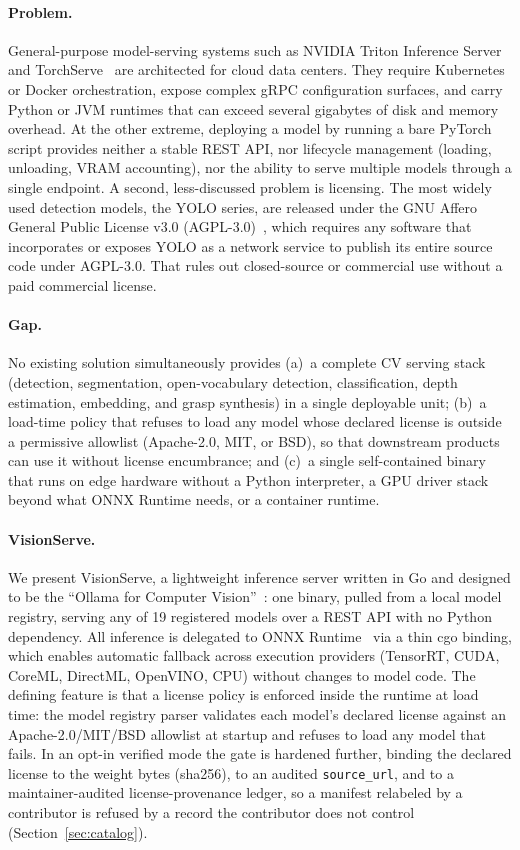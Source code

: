 \paragraph{Problem.}
General-purpose model-serving systems such as NVIDIA Triton Inference Server~\cite{nvidia2023triton}
and TorchServe~\cite{pytorch2023torchserve} are architected for cloud data centers. They
require Kubernetes or Docker orchestration, expose complex gRPC configuration surfaces, and
carry Python or JVM runtimes that can exceed several gigabytes of disk and memory overhead.
At the other extreme, deploying a model by running a bare PyTorch script provides neither
a stable REST API, nor lifecycle management (loading, unloading, VRAM accounting), nor the
ability to serve multiple models through a single endpoint.
A second, less-discussed problem is licensing. The most widely used detection models, the YOLO
series, are released under the GNU Affero General Public License v3.0
(AGPL-3.0)~\cite{ultralytics2023yolo,agpllicense}, which requires any software that incorporates
or exposes YOLO as a network service to publish its entire source code under AGPL-3.0. That
rules out closed-source or commercial use without a paid commercial license.

\paragraph{Gap.}
No existing solution simultaneously provides
(a)~a complete CV serving stack (detection, segmentation, open-vocabulary
detection, classification, depth estimation, embedding, and grasp synthesis) in a single
deployable unit;
(b)~a load-time policy that refuses to load any model whose declared license is
outside a permissive allowlist (Apache-2.0, MIT, or BSD), so that downstream products can use it
without license encumbrance; and
(c)~a single self-contained binary that runs on edge hardware without a Python
interpreter, a GPU driver stack beyond what ONNX Runtime needs, or a container runtime.

\paragraph{VisionServe.}
We present VisionServe, a lightweight inference server written in Go and designed to be
the ``Ollama for Computer Vision''~\cite{ollama2023}: one binary, pulled from a local model
registry, serving any of 19 registered models over a REST API with no Python dependency.
All inference is delegated to ONNX Runtime~\cite{onnxruntime} via a thin cgo binding,
which enables automatic fallback across execution providers (TensorRT, CUDA, CoreML,
DirectML, OpenVINO, CPU) without changes to model code.
The defining feature is that a license policy is enforced inside the runtime at load time: the
model registry parser validates each model's declared license against an Apache-2.0/MIT/BSD
allowlist at startup and refuses to load any model that fails. In an opt-in verified mode the
gate is hardened further, binding the declared license to the weight bytes (sha256), to an
audited \texttt{source\_url}, and to a maintainer-audited license-provenance ledger, so a
manifest relabeled by a contributor is refused by a record the contributor does not control
(Section~\ref{sec:catalog}).

